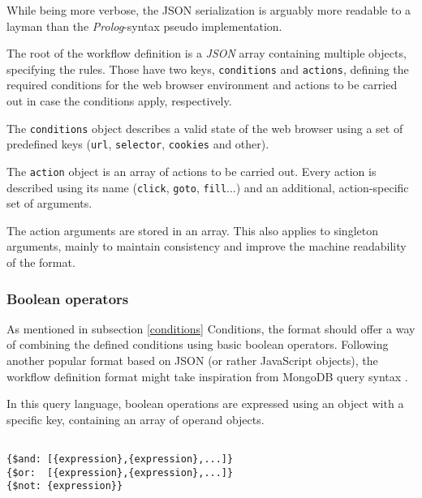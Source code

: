 \emptyline

While being more verbose, the JSON serialization is arguably more readable to a layman than the \textit{Prolog}-syntax pseudo implementation.

The root of the workflow definition is a \textit{JSON} array containing multiple objects, specifying the rules. 
Those have two keys, \texttt{conditions} and \texttt{actions}, defining the required conditions for the web browser environment and actions to be carried out in case the conditions apply, respectively.

The \texttt{conditions} object describes a valid state of the web browser using a set of predefined keys (\texttt{url}, \texttt{selector}, \texttt{cookies} and other).

The \texttt{action} object is an array of actions to be carried out. 
Every action is described using its name (\texttt{click}, \texttt{goto}, \texttt{fill}...) and an additional, action-specific set of arguments.

The action arguments are stored in an array. 
This also applies to singleton arguments, mainly to maintain consistency and improve the machine readability of the format.


\subsubsection{Boolean operators}
As mentioned in subsection \ref{conditions} Conditions, the format should offer a way of combining the defined conditions using basic boolean operators.
Following another popular format based on JSON (or rather JavaScript objects), the workflow definition format might take inspiration from MongoDB query syntax .

In this query language, boolean operations are expressed using an object with a specific key, containing an array of operand objects.

\begin{center}
\begin{minipage}{0.95\linewidth}
    \begin{verbatim}

{$and: [{expression},{expression},...]}
{$or:  [{expression},{expression},...]}
{$not: {expression}}
    \end{verbatim}
\end{minipage}
\end{center}

